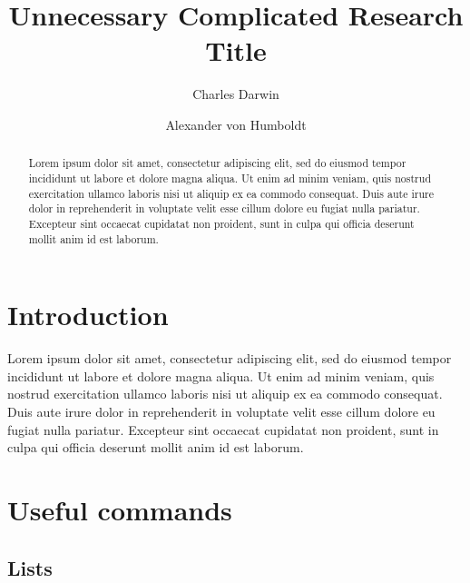 \documentclass{article}
\begin{document}
	
	\title{Unnecessary Complicated Research Title}
	
	\author[a,*]{Charles Darwin} 
	\author[a,b]{Alexander von Humboldt} 

	
	\date{}
	
	\maketitle
	
	\tableofcontents
	
	\begin{abstract}
		
	Lorem ipsum dolor sit amet, consectetur adipiscing elit, sed do eiusmod tempor incididunt ut labore et dolore magna aliqua. Ut enim ad minim veniam, quis nostrud exercitation ullamco laboris nisi ut aliquip ex ea commodo consequat. Duis aute irure dolor in reprehenderit in voluptate velit esse cillum dolore eu fugiat nulla pariatur. Excepteur sint occaecat cupidatat non proident, sunt in culpa qui officia deserunt mollit anim id est laborum.
		
	\end{abstract}
	
	\section{Introduction}
	
	Lorem ipsum dolor sit amet, consectetur adipiscing elit, sed do eiusmod tempor incididunt ut labore et dolore magna aliqua. Ut enim ad minim veniam, quis nostrud exercitation ullamco laboris nisi ut aliquip ex ea commodo consequat. Duis aute irure dolor in reprehenderit in voluptate velit esse cillum dolore eu fugiat nulla pariatur. Excepteur sint occaecat cupidatat non proident, sunt in culpa qui officia deserunt mollit anim id est laborum.
	
	\section{Useful commands}
	
	\subsection{Lists}
	
\end{document}
